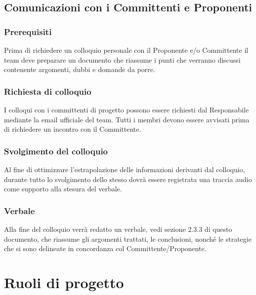 \subsection{Comunicazioni con i Committenti e Proponenti}

\subsubsection{Prerequisiti}

Prima di richiedere un colloquio personale con il Proponente e/o Committente il team deve preparare un documento che riassume i punti che verranno discussi contenente argomenti, dubbi e domande da porre.

\subsubsection{Richiesta di colloquio}

I colloqui con i committenti di progetto possono essere richiesti dal Responsabile mediante la email ufficiale del team. Tutti i membri devono essere avvisati prima di richiedere un incontro con il Committente.

\subsubsection{Svolgimento del colloquio}
Al fine di ottimizzare l'estrapolazione delle informazioni derivanti dal colloquio, durante tutto lo svolgimento dello stesso dovrà essere registrata una traccia audio come supporto alla stesura del verbale.

\subsubsection{Verbale}

Alla fine del colloquio verrà redatto un verbale, vedi sezione 2.3.3 di questo documento, che riassume gli argomenti trattati, le conclusioni, nonché le strategie che si sono delineate in concordanza col Committente/Proponente.



\newpage




\newpage
\section{Ruoli di progetto}%

